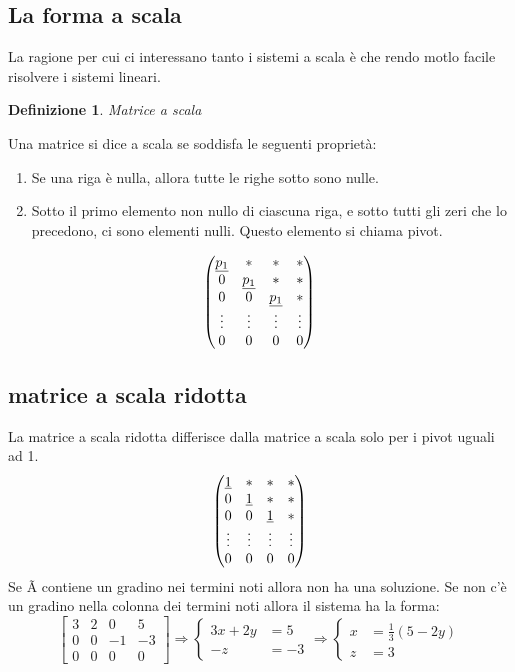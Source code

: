 \documentclass{report}
\newtheorem{definizione}{\textbf{Definizione}}[section]
\begin{document}
\subsection{La forma a scala}
La ragione per cui ci interessano tanto i sistemi a scala è che rendo motlo facile risolvere i sistemi lineari.
\begin{definizione}
  Matrice a scala
\end{definizione}
  Una matrice si dice a scala se soddisfa le seguenti proprietà:
  \begin{enumerate}
    \item Se una riga è nulla, allora tutte le righe sotto sono nulle.
          \item Sotto il primo elemento non nullo di ciascuna riga, e sotto tutti gli zeri che lo precedono, ci
sono elementi nulli. Questo elemento si chiama pivot.
  \end{enumerate}
\begin{equation}
\begin{pmatrix}
\uline{p_1} & * & *& *\\
0 & \uline{p_1} & * & * \\
0 & 0 & \uline{p_1} & * \\
\vdots & \vdots & \vdots & \vdots\\
  0 & 0 & 0 & 0
\end{pmatrix}
\end{equation}
\subsection{matrice a scala ridotta}
La matrice a scala ridotta differisce dalla matrice a scala solo per i pivot uguali ad 1.
\begin{equation}
\begin{pmatrix}
\uline{1} & * & *& *\\
0 & \uline{1} & * & * \\
0 & 0 & \uline{1} & * \\
  \vdots & \vdots & \vdots & \vdots\\
  0 & 0 & 0 & 0\\
\end{pmatrix}
\end{equation}
Se \~A contiene un gradino nei termini noti allora non ha una soluzione. Se non c'è un gradino nella colonna dei termini noti allora il sistema ha la forma:
\begin{equation*}
  \begin{bmatrix}
    3 & 2 & 0 & 5\\
    0 & 0 &-1 & -3\\
    0 & 0 & 0 & 0
  \end{bmatrix} \Longrightarrow \left\{\begin{aligned}
    3x+2y&=5\\
    -z&=-3
  \end{aligned}\right. \Longrightarrow
\left\{\begin{aligned} x&=\frac{1}{3}(5-2y)\\
  z&=3
  \end{aligned}\right.
\end{equation*}
\end{document}
